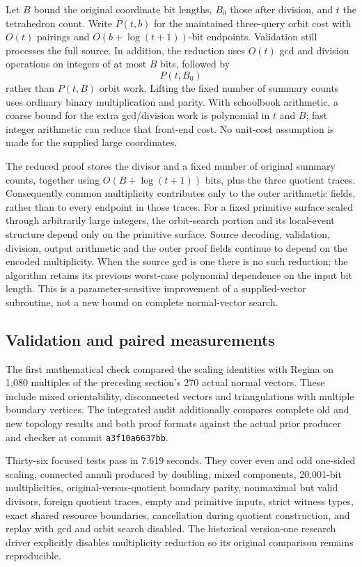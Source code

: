 Let $B$ bound the original coordinate bit lengths, $B_0$ those after
division, and $t$ the tetrahedron count. Write $P(t,b)$ for the maintained
three-query orbit cost with $O(t)$ pairings and $O(b+\log(t+1))$-bit
endpoints. Validation still processes the full source. In addition, the
reduction uses $O(t)$ gcd and division operations on integers of at most
$B$ bits, followed by
\[
 P(t,B_0)
\]
rather than $P(t,B)$ orbit work. Lifting the fixed number of summary counts
uses ordinary binary multiplication and parity. With schoolbook arithmetic,
a coarse bound for the extra gcd/division work is polynomial in $t$ and
$B$; fast integer arithmetic can reduce that front-end cost. No unit-cost
assumption is made for the supplied large coordinates.

The reduced proof stores the divisor and a fixed number of original
summary counts, together using $O(B+\log(t+1))$ bits, plus the three
quotient traces. Consequently common multiplicity contributes only to the
outer arithmetic fields, rather than to every endpoint in those traces.
For a fixed primitive surface scaled through arbitrarily large integers,
the orbit-search portion and its local-event structure depend only on the
primitive surface. Source decoding, validation, division, output arithmetic
and the outer proof fields continue to depend on the encoded multiplicity.
When the source gcd is one there is no such reduction; the algorithm retains
its previous worst-case polynomial dependence on the input bit length.
This is a parameter-sensitive improvement of a supplied-vector subroutine,
not a new bound on complete normal-vector search.

\subsection{Validation and paired measurements}

The first mathematical check compared the scaling identities with Regina
on 1,080 multiples of the preceding section's 270 actual normal vectors.
These include mixed orientability, disconnected vectors and triangulations
with multiple boundary vertices. The integrated audit additionally compares
complete old and new topology results and both proof formats against the
actual prior producer and checker at commit \texttt{a3f10a6637bb}.

Thirty-six focused tests pass in 7.619 seconds. They cover even and odd
one-sided scaling, connected annuli produced by doubling, mixed components,
20,001-bit multiplicities, original-versus-quotient boundary parity,
nonmaximal but valid divisors, foreign quotient traces, empty and primitive
inputs, strict witness types, exact shared resource boundaries, cancellation
during quotient construction, and replay with gcd and orbit search disabled.
The historical version-one research driver explicitly disables multiplicity
reduction so its original comparison remains reproducible.

